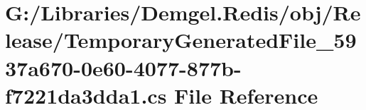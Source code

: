 \hypertarget{_release_2_temporary_generated_file__5937a670-0e60-4077-877b-f7221da3dda1_8cs}{}\section{G\+:/\+Libraries/\+Demgel.Redis/obj/\+Release/\+Temporary\+Generated\+File\+\_\+5937a670-\/0e60-\/4077-\/877b-\/f7221da3dda1.cs File Reference}
\label{_release_2_temporary_generated_file__5937a670-0e60-4077-877b-f7221da3dda1_8cs}
